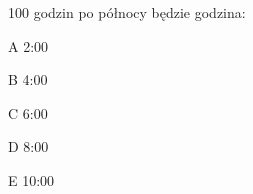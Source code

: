 \begin{tresc}
100 godzin po północy będzie godzina:
\end{tresc}
\begin{wariant}{A} 2:00 \end{wariant}
\begin{wariant}{B} 4:00 \end{wariant}
\begin{wariant}{C} 6:00 \end{wariant}
\begin{wariant}{D} 8:00 \end{wariant}
\begin{wariant}{E} 10:00 \end{wariant}
